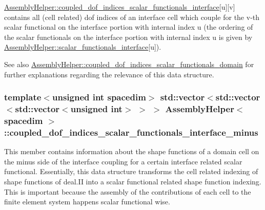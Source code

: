 \hyperlink{class_assembly_helper_ab346e146cf91fb7a0688076551b37355}{Assembly\+Helper\+::coupled\+\_\+dof\+\_\+indices\+\_\+scalar\+\_\+functionals\+\_\+interface}\mbox{[}{\ttfamily u}\mbox{]}\mbox{[}{\ttfamily v}\mbox{]} contains all (cell related) dof indices of an interface cell which couple for the {\ttfamily v-\/th} scalar functional on the interface portion with internal index {\ttfamily u} (the ordering of the scalar functionals on the interface portion with internal index {\ttfamily u} is given by \hyperlink{class_assembly_helper_a29aa77e0e8e6b35c94966ea88840e462}{Assembly\+Helper\+::scalar\+\_\+functionals\+\_\+interface}\mbox{[}{\ttfamily u}\mbox{]}).

See also \hyperlink{class_assembly_helper_a1a26b40224e3f04e5168accc91486493}{Assembly\+Helper\+::coupled\+\_\+dof\+\_\+indices\+\_\+scalar\+\_\+functionals\+\_\+domain} for further explanations regarding the relevance of this data structure. 
\subsubsection[{\texorpdfstring{coupled\+\_\+dof\+\_\+indices\+\_\+scalar\+\_\+functionals\+\_\+interface\+\_\+minus}{coupled_dof_indices_scalar_functionals_interface_minus}}]{\setlength{\rightskip}{0pt plus 5cm}template$<$unsigned int spacedim$>$ std\+::vector$<$std\+::vector$<$std\+::vector$<$unsigned int$>$ $>$ $>$ {\bf Assembly\+Helper}$<$ spacedim $>$\+::coupled\+\_\+dof\+\_\+indices\+\_\+scalar\+\_\+functionals\+\_\+interface\+\_\+minus\hspace{0.3cm}{\ttfamily [private]}}\hypertarget{class_assembly_helper_a12299d82365553a21fef8529c8fe8a17}{}\label{class_assembly_helper_a12299d82365553a21fef8529c8fe8a17}
This member contains information about the shape functions of a domain cell on the minus side of the interface coupling for a certain interface related scalar functional. Essentially, this data structure transforms the cell related indexing of shape functions of deal.\+II into a scalar functional related shape function indexing. This is important because the assembly of the contributions of each cell to the finite element system happens scalar functional wise.

